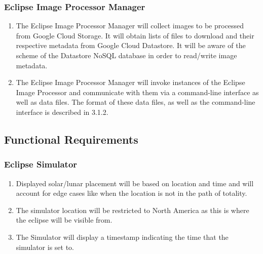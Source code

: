 \documentclass[10pt, onecolumn, draftclsnofoot, letterpaper, compsoc]{IEEEtran}
\begin{document}
\subsubsection{Eclipse Image Processor Manager}
	\begin{enumerate}
		\item The Eclipse Image Processor Manager will collect images to be processed
		from Google Cloud Storage. It will obtain lists of files to download and their
		respective metadata from Google Cloud Datastore. It will be aware of the scheme
		of the Datastore NoSQL database in order to read/write image metadata.

		\item The Eclipse Image Processor Manager will invoke instances of the Eclipse
		Image Processor and communicate with them via a command-line interface as well
		as data files. The format of these data files, as well as the command-line interface
		is described in 3.1.2.
	\end{enumerate}

\subsection{Functional Requirements}

\subsubsection{Eclipse Simulator}
	\begin{enumerate}
		\item Displayed solar/lunar placement will be based on location and
		time and will account for edge cases like when the location is not in
		the path of totality.

		\item The simulator location will be restricted to North America as this is where
		the eclipse will be visible from.

		\item The Simulator will display a timestamp indicating the time that the simulator
		is set to.
	\end{enumerate}
\end{document}

